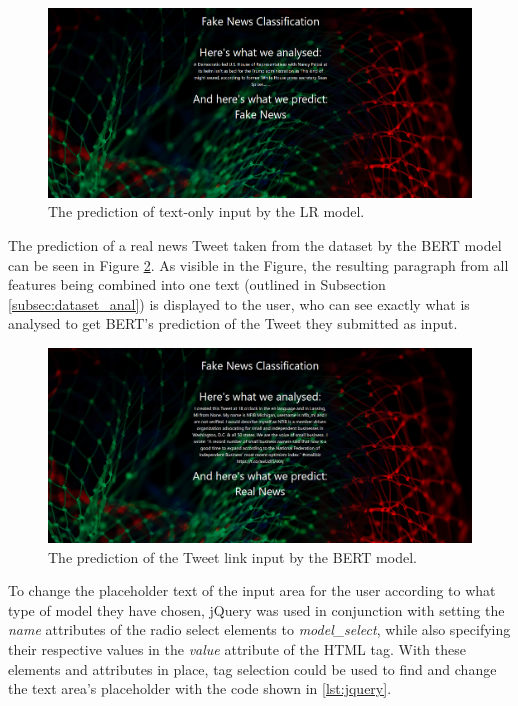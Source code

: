 \documentclass{l4proj}
\begin{document}
\begin{figure}
    \centering
    \includegraphics[width=1\linewidth]{images/web/lr.png}    

    \caption{The prediction of text-only input by the LR model.}
    \label{fig:lr_prediction} 
\end{figure}

The prediction of a real news Tweet taken from the dataset by the BERT model can be seen in Figure \ref{fig:bert_prediction}. As visible in the Figure, the resulting paragraph from all features being combined into one text (outlined in Subsection \ref{subsec:dataset_anal}) is displayed to the user, who can see exactly what is analysed to get BERT's prediction of the Tweet they submitted as input.

\begin{figure}
    \centering
    \includegraphics[width=1\linewidth]{images/web/bert.png}    

    \caption{The prediction of the Tweet link input by the BERT model.}
    \label{fig:bert_prediction} 
\end{figure}

To change the placeholder text of the input area for the user according to what type of model they have chosen, jQuery was used in conjunction with setting the \textit{name} attributes of the radio select elements to \textit{model\_select}, while also specifying their respective values in the \textit{value} attribute of the HTML tag. With these elements and attributes in place, tag selection could be used to find and change the text area's placeholder with the code shown in \ref{lst:jquery}.
\end{document}
